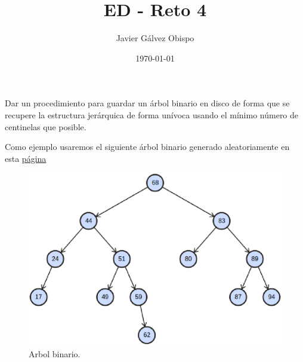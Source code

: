 \documentclass{article}
\begin{document}
\title{\Huge ED - Reto 4}
\author{\Large Javier Gálvez Obispo}
\date{\large\today}
\maketitle

\begin{flushleft}
  {\Large Dar un procedimiento para guardar un árbol binario en disco de forma que se
  recupere la estructura jerárquica de forma unívoca usando el mínimo número
  de centinelas que posible.}


  \vspace{\baselineskip}
  Como ejemplo usaremos el siguiente árbol binario generado aleatoriamente en esta
  \href{http://btv.melezinek.cz/binary-search-tree.html}{página}
\end{flushleft}

\begin{figure}[H]
  \centering
  \includegraphics[width=\textwidth,height=\textheight,keepaspectratio]{arbol.eps}
  \caption{Arbol binario.}
\end{figure}
\end{document}

